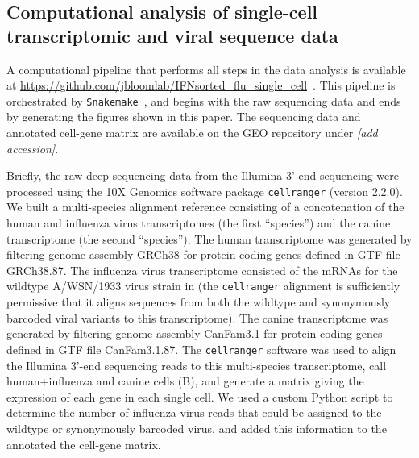 \documentclass[9pt,lineno]{elife}
\newcommand{\jdbcomment}[1]{\emph{\color{red} [#1]}}
\begin{document}
\subsection{Computational analysis of single-cell transcriptomic and viral sequence data}
A computational pipeline that performs all steps in the data analysis is available at \url{https://github.com/jbloomlab/IFNsorted_flu_single_cell}~\citep{russell2018github}. 
This pipeline is orchestrated by \texttt{Snakemake}~\citep{koster2012snakemake}, and begins with the raw sequencing data and ends by generating the figures shown in this paper.
The sequencing data and annotated cell-gene matrix are available on the GEO repository under \jdbcomment{add accession}.

Briefly, the raw deep sequencing data from the Illumina 3'-end sequencing were processed using the 10X Genomics software package \texttt{cellranger} (version 2.2.0). 
We built a multi-species alignment reference consisting of a concatenation of the human and influenza virus transcriptomes (the first ``species'') and the canine transcriptome (the second ``species''). 
The human transcriptome was generated by filtering genome assembly GRCh38 for protein-coding genes defined in GTF file GRCh38.87.
The influenza virus transcriptome consisted of the mRNAs for the wildtype A/WSN/1933 virus strain in  (the \texttt{cellranger} alignment is sufficiently permissive that it aligns sequences from both the wildtype and synonymously barcoded viral variants to this transcriptome).
The canine transcriptome was generated by filtering genome assembly CanFam3.1 for protein-coding genes defined in GTF file CanFam3.1.87.
The \texttt{cellranger} software was used to align the Illumina 3'-end sequencing reads to this multi-species transcriptome, call human+influenza and canine cells (B), and generate a matrix giving the expression of each gene in each single cell.
We used a custom Python script to determine the number of influenza virus reads that could be assigned to the wildtype or synonymously barcoded virus, and added this information to the annotated the cell-gene matrix.
\end{document}
